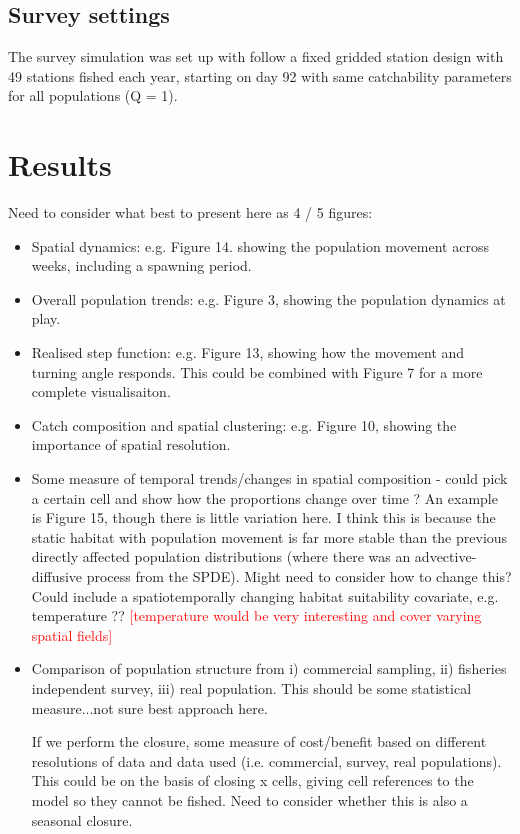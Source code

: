 \documentclass[review]{elsarticle}
\begin{document}
\subsection{Survey settings}

The survey simulation was set up with follow a fixed gridded station design
with 49 stations fished each year, starting on day 92 with same catchability
parameters for all populations (Q = 1). 

\section{Results}

Need to consider what best to present here as 4 / 5 figures:

\begin{itemize}
	\item Spatial dynamics: e.g. Figure 14. showing the population movement
		across weeks, including a spawning period.
	\item Overall population trends: e.g. Figure 3, showing the population
		dynamics at play.
	\item Realised step function: e.g. Figure 13, showing how the movement
		and turning angle responds. This could be combined with Figure
		7 for a more complete visualisaiton.
	\item Catch composition and spatial clustering: e.g. Figure 10, showing
		the importance of spatial resolution.
	\item Some measure of temporal trends/changes in spatial composition -
		could pick a certain cell and show how the proportions change
		over time ? An example is Figure 15, though there is little
		variation here. I think this is because the static habitat with
		population movement is far more stable than the previous
		directly affected population distributions (where there was an
		advective-diffusive process from the SPDE). Might need to
		consider how to change this?  Could include a spatiotemporally
		changing habitat suitability covariate, e.g. temperature ??
		\textcolor{red}{[temperature would be very interesting and
			cover varying spatial fields]}
	\item Comparison of population structure from i) commercial sampling,
		ii) fisheries independent survey, iii) real population. This
		should be some statistical measure...not sure best approach
		here.
	\item [If we perform the closure, some measure of cost/benefit based on
		different resolutions of data and data used (i.e. commercial,
		survey, real populations). This could be on the basis of
		closing x cells, giving cell references to the model so they
		cannot be fished. Need to consider whether this is also a
		seasonal closure.]
\end{itemize} 
\end{document}

